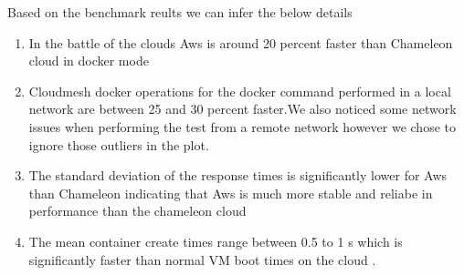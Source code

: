 \documentclass[9pt,twocolumn,twoside]{../../styles/osajnl}
\begin{document}
Based on the benchmark reults we can infer the below details
\begin{enumerate}
\item  In the battle of the clouds Aws is around 20 percent faster than Chameleon cloud in docker mode
\item  Cloudmesh docker operations for the docker command performed in a local network are between
25 and 30  percent faster.We also noticed some network issues when performing the test from a
remote network however we chose to ignore those outliers in the plot.
\item The standard deviation of the response times is significantly lower for Aws than Chameleon indicating 
that Aws is much more stable and reliabe in performance than the chameleon cloud
\item The mean container create times range between 0.5 to 1 s which is significantly faster than normal VM 
boot times on the cloud .
\end{enumerate}
\end{document}
